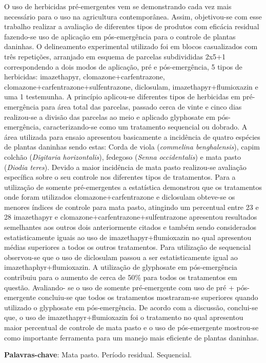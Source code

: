 \documentclass[article,12pt,onesidea,4paper,english,brazil]{abntex2}
\begin{document}
	\noindent O uso de herbicidas pré-emergentes vem se demonstrando cada vez mais
	necessário para o uso na agricultura contemporânea. Assim, objetivou-se com esse
	trabalho realizar a avaliação de diferentes tipos de produtos com eficácia residual
	fazendo-se uso de aplicação em pós-emergência para o controle de plantas
	daninhas. O delineamento experimental utilizado foi em blocos casualizados com
	três repetições, arranjado em esquema de parcelas subdivididas 2x5+1
	correspondendo a dois modos de aplicação, pré e pós-emergência, 5 tipos de
	herbicidas: imazethapyr, clomazone+carfentrazone,
	clomazone+carfentrazone+sulfentrazone, diclosulam, imazethapyr+flumioxazin e
	uma 1 testemunha. A princípio aplicou-se diferentes tipos de herbicidas em pré-
	emergência para área total das parcelas, passado cerca de vinte e cinco dias
	realizou-se a divisão das parcelas ao meio e aplicado glyphosate em pós-
	emergência, caracterizando-se como um tratamento sequencial ou dobrado. A área
	utilizada para ensaio apresentou basicamente a incidência de quatro espécies de
	plantas daninhas sendo estas: Corda de viola (\textit{commelina benghalensis}), capim colchão (\textit{Digitaria horizontalis}), fedegoso (\textit{Senna occidentalis}) e mata pasto (\textit{Diodia teres}). Devido a maior incidência de mata pasto realizou-se avaliação específica sobre o seu controle nos diferentes tipos de tratamentos. Para a utilização de
	somente pré-emergentes a estatística demonstrou que os tratamentos onde foram
	utilizados clomazone+carfentrazone e diclosulam obteve-se os menores índices de
	controle para mata pasto, atingindo um percentual entre 23 e 28%
	imazethapyr e clomazone+carfentrazone+sulfentrazone apresentou resultados
	semelhantes aos outros dois anteriormente citados e também sendo considerados
	estatisticamente iguais ao uso de imazethapyr+flumioxazin no qual apresentou
	médias superiores a todos os outros tratamentos. Para utilização de sequencial
	observou-se que o uso de diclosulam passou a ser estatisticamente igual ao
	imazethaphyr+flumioxazin. A utilização de glyphosate em pós-emergência contribuiu
	para o aumento de cerca de 50\% para todos os tratamentos em questão. Avaliando-
	se o uso de somente pré-emergente com uso de pré + pós-emergente concluiu-se
	que todos os tratamentos mostraram-se superiores quando utilizado o glyphosate
	em pós-emergência. De acordo com a discussão, conclui-se que, o uso de
	imazethapyr+flumioxazin foi o tratamento no qual apresentou maior percentual de
	controle de mata pasto e o uso de pós-emergente mostrou-se como importante
	ferramenta para um manejo mais eficiente de plantas daninhas.
	
	\vspace{\onelineskip}
	
	\noindent
	\textbf{Palavras-chave}: Mata pasto. Período residual. Sequencial.	
	
\end{document}
